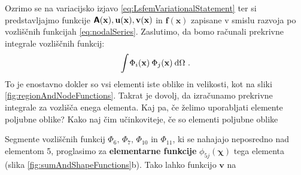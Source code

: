 Ozrimo se na variacijsko izjavo \eqref{eq:LsfemVariationalStatement} ter si predstavljajmo funkcije $\bm{\mathsf{A}}(\mathbf{x}), \mathbf{u(x)}, \mathbf{v(x)}$ in $\mathbf{f(x)}$ zapisane v smislu razvoja po vozliščnih funkcijah \eqref{eq:nodalSeries}. Zaslutimo, da bomo računali prekrivne integrale vozliščnih funkcij:
\begin{equation}
    \int \mkern-2mu \Phi_i(\mathbf{x}) \mkern4mu \Phi_j(\mathbf{x}) \mkern4mu \mathrm{d} \Omega \ .
\end{equation}
To je enostavno dokler so vsi elementi iste oblike in velikosti, kot na sliki \ref{fig:regionAndNodeFunctions}. Takrat je dovolj, da izračunamo prekrivne integrale za vozlišča enega elementa. Kaj pa, če želimo uporabljati elemente poljubne oblike? Kako naj čim učinkoviteje, če so elementi poljubne oblike

 Segmente vozliščnih funkcij $\Phi_6, \, \Phi_7, \, \Phi_{10}$ in $\Phi_{11}$, ki se nahajajo neposredno nad elementom 5, proglasimo za \textbf{elementarne funkcije} $\phi_{5 j}(\bm\chi)$ tega elementa (slika \ref{fig:sumAndShapeFunctions}b). Tako lahko funkcijo $\mathbf{v}$ na

